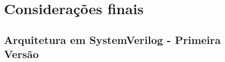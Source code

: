 \documentclass[
	12pt,				%
	openright,			%
	oneside,			%
	a4paper,			%
	english,			%
	french,				%
	spanish,			%
	brazil,				%
	]{abntex2}
\begin{document}
\chapter*[Considerações finais]{Considerações finais}






\postextual

%

%
%


\begin{apendicesenv}

\partapendices
\chapter{Arquitetura em SystemVerilog - Primeira Versão}\label{ap:arquitetura_sv_v1}
% 
\end{apendicesenv}
\end{document}
